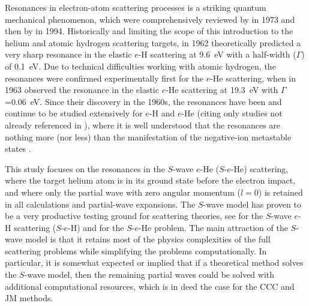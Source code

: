 \documentclass[aip
, pra
, showpacs
, aps
, twocolumn
, groupedaddress
, floatfix
]{revtex4}
\begin{document}
Resonances in electron-atom scattering processes is a striking quantum mechanical phenomenon, which were comprehensively reviewed by \citet{Schulz73} in 1973 and then by \citet{BC94} in 1994.
Historically and limiting the scope of this introduction to the helium and atomic hydrogen scattering targets, in 1962 \citet{BS62} theoretically predicted a very sharp resonance in the elastic $e$-H scattering  at 9.6~eV with a half-width ($\Gamma$) of 0.1~eV. Due to technical difficulties working with atomic hydrogen, the resonances were confirmed experimentally first for the $e$-He scattering, when in 1963 \citet{Schulz63} observed the resonance in the elastic $e$-He scattering at 19.3~eV with $\Gamma$=0.06~eV.
Since their discovery in the 1960s, the resonances have been and continue to be studied extensively
for $e$-H \cite{WC94,FRA94_pra,KM94pL741,OSB95p4320,DLTL96,DTLM99,DTL00} and $e$-He \cite{KM95pL139,HBSBB96,NP01,PN03,SMC2006} (citing only studies not already referenced in \cite{Schulz73,BC94}),
where it is well understood that the resonances are nothing more (nor less) than the manifestation of the negative-ion metastable states \cite{BC94}.


This study focuses on the resonances in the $S$-wave $e$-He ($S$-$e$-He) scattering,
where the target helium atom is in its ground state before the electron impact,
and where only the partial wave with zero angular momentum ($l=0$) is retained in all calculations
and partial-wave expansions.
The $S$-wave model has proven to be a very productive testing ground for scattering theories,
see \cite{T62,HY74p1209,P78,P80,P81,CO84,BS92p53,BST93,KM94pL407,IDHF95,PS96,JS02,JS00l,BRIM99,S99l,MHR02,BS04,Frapiccini10} for the $S$-wave $e$-H scattering ($S$-$e$-H)
and \cite{DHIF94,PMR99,PBFS02,PNBFS04,HMR05R,HMR05,BS10p022715,BS10p022716,KFB11} for  the $S$-$e$-He problem.
The main attraction of the $S$-wave model is that it retains most of the physics complexities of the full
scattering problems while simplifying the problems computationally.
In particular, it is somewhat expected or implied that if a theoretical method solves the $S$-wave model, then
the remaining partial waves could be solved with additional computational resources, which is in deed the case for the CCC \cite{FB95} and JM \cite{KM94pL741,KM95pL139} methods.
\end{document}
